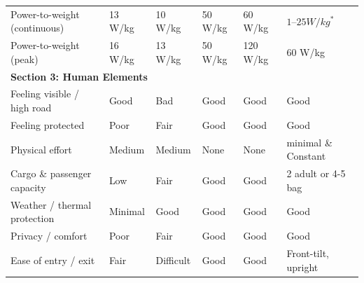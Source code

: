 \begin{table}[h!]
\begin{tabularx}{\textwidth}{lXXXXX}
Power-to-weight (continuous) & \cellcolor{LightOrange}13 W/kg       & \cellcolor{LightOrange}10 W/kg       & \cellcolor{LightGreen}50 W/kg        & \cellcolor{LightGreen}60 W/kg        & \cellcolor{LightOrange}$1–25 W/kg^*$ \\
Power-to-weight (peak)       & \cellcolor{LightOrange}16 W/kg       & \cellcolor{LightOrange}13 W/kg       & \cellcolor{LightGreen}50 W/kg        & \cellcolor{LightGreen}120 W/kg       & \cellcolor{LightGreen}60 W/kg \\
\midrule
\multicolumn{6}{l}{\textbf{Section 3: Human Elements}} \\
Feeling visible / high road   & \cellcolor{LightGreen}Good           & \cellcolor{LightRed}Bad              & \cellcolor{LightGreen}Good           & \cellcolor{LightGreen}Good           & \cellcolor{LightGreen}Good \\
Feeling protected             & \cellcolor{LightRed}Poor             & \cellcolor{LightOrange}Fair          & \cellcolor{LightGreen}Good           & \cellcolor{LightGreen}Good           & \cellcolor{LightGreen}Good \\
Physical effort               & \cellcolor{LightOrange}Medium        & \cellcolor{LightOrange}Medium        & \cellcolor{LightGreen}None           & \cellcolor{LightGreen}None           & \cellcolor{LightGreen}minimal \& Constant \\
Cargo \& passenger capacity   & \cellcolor{LightRed}Low              & \cellcolor{LightOrange}Fair          & \cellcolor{LightGreen}Good           & \cellcolor{LightGreen}Good           & \cellcolor{LightGreen}2 adult or 4-5 bag \\
Weather / thermal protection  & \cellcolor{LightRed}Minimal          & \cellcolor{LightGreen}Good           & \cellcolor{LightGreen}Good           & \cellcolor{LightGreen}Good           & \cellcolor{LightGreen}Good \\
Privacy / comfort             & \cellcolor{LightRed}Poor             & \cellcolor{LightOrange}Fair          & \cellcolor{LightGreen}Good           & \cellcolor{LightGreen}Good           & \cellcolor{LightGreen}Good \\
Ease of entry / exit          & \cellcolor{LightOrange}Fair          & \cellcolor{LightRed}Difficult        & \cellcolor{LightGreen}Good           & \cellcolor{LightGreen}Good           & \cellcolor{LightGreen}Front-tilt, upright \\
\bottomrule
\end{tabularx}
\end{table}

